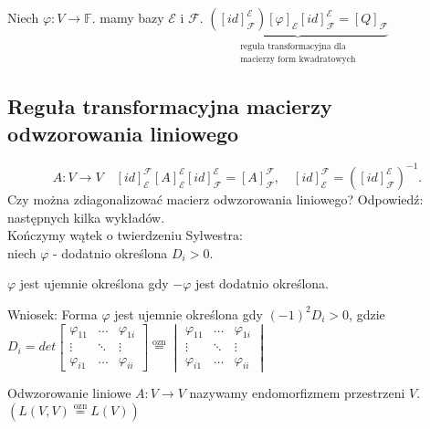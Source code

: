 \documentclass[../main.tex]{subfiles}
\begin{document}
Niech $\varphi: V\to \mathbb{F}$. mamy bazy $\mathcal{E}$ i $\mathcal{F}$. $\underbrace{([id]_{\mathcal{F}}^{\mathcal{E}})[\varphi]_\mathcal{E}[id]_{\mathcal{F}}^\mathcal{E} = [Q]_\mathcal{F}}_{\substack{\text{reguła transformacyjna dla}\\ \text{macierzy form kwadratowych}}}$

\subsection{Reguła transformacyjna macierzy odwzorowania liniowego}
\[
    A:V\to V\quad [id]_\mathcal{E}^\mathcal{F} [A]_\mathcal{E}^\mathcal{E} [id]_\mathcal{F}^\mathcal{E} = [A]_\mathcal{F}^\mathcal{F}, \quad [id]_\mathcal{E}^\mathcal{F} = \left( [id]_\mathcal{F}^\mathcal{E} \right) ^{-1}
.\]
Czy można zdiagonalizować macierz odwzorowania liniowego? Odpowiedź: następnych kilka wykładów.\\
Kończymy wątek o twierdzeniu Sylwestra:\\
niech $\varphi$ - dodatnio określona $D_i > 0$.
\begin{definicja}
    $\varphi$ jest ujemnie określona gdy $-\varphi$ jest dodatnio określona.
\end{definicja}
Wniosek: Forma $\varphi$ jest ujemnie określona gdy $(-1)^{2}D_i > 0$, gdzie $D_i = det\begin{bmatrix} \varphi_{11} & \ldots & \varphi_{1i}\\ \vdots & \ddots & \vdots \\ \varphi_{i1} & \ldots & \varphi_{ii} \end{bmatrix} \overset{\text{ozn}}{=} \begin{vmatrix} \varphi_{11} & \ldots & \varphi_{1i}\\ \vdots & \ddots & \vdots \\ \varphi_{i1} & \ldots & \varphi_{ii} \end{vmatrix}$
\begin{definicja}
    Odwzorowanie liniowe $A: V\to V$ nazywamy endomorfizmem przestrzeni $V $. $(L(V,V) \overset{\text{ozn}}{=} L(V))$
\end{definicja}
\end{document}
